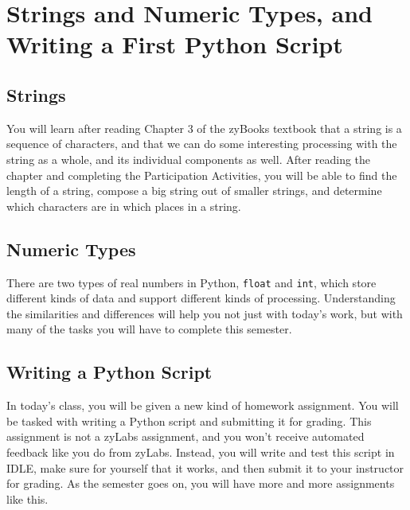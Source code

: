 
\chapter{Strings and Numeric Types, and Writing a First Python Script}
\label{day:firstscript}


\minitoc

\section{Strings}

You will learn after reading Chapter 3 of the zyBooks textbook that a string is a sequence of characters, and that we can do some interesting processing with the string as a whole, and its individual components as well.  After reading the chapter and completing the Participation Activities, you will be able to find the length of a string, compose a big string out of smaller strings, and determine which characters are in which places in a string.

\section{Numeric Types}

There are two types of real numbers in Python, \texttt{float} and \texttt{int}, which store different kinds of data and support different kinds of processing.  Understanding the similarities and differences will help you not just with today's work, but with many of the tasks you will have to complete this semester.

\section{Writing a Python Script}

In today's class, you will be given a new kind of homework assignment.  You will be tasked with writing a Python script and submitting it for grading.  This assignment is not a zyLabs assignment, and you won't receive automated feedback like you do from zyLabs.  Instead, you will write and test this script in IDLE, make sure for yourself that it works, and then submit it to your instructor for grading.  As the semester goes on, you will have more and more assignments like this.

